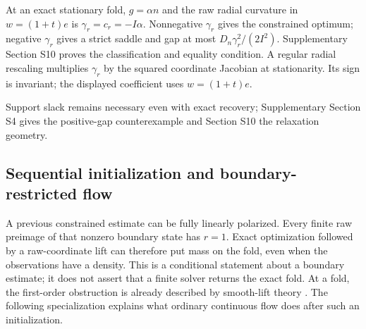 \documentclass[pdflatex,sn-mathphys-num]{sn-jnl}
\begin{document}
At an exact stationary fold, $g=\alpha n$ and the raw radial curvature in $w=(1+t)e$ is $\gamma_r=c_r=-I\alpha$. Nonnegative $\gamma_r$ gives the constrained optimum; negative $\gamma_r$ gives a strict saddle and gap at most $D_n\gamma_r^2/(2I^2)$. Supplementary Section S10 proves the classification and equality condition. A regular radial rescaling multiplies $\gamma_r$ by the squared coordinate Jacobian at stationarity. Its sign is invariant; the displayed coefficient uses $w=(1+t)e$.

Support slack remains necessary even with exact recovery; Supplementary Section S4 gives the positive-gap counterexample and Section S10 the relaxation geometry.





\subsection{Sequential initialization and boundary-restricted flow}
\label{sec:sequential}
A previous constrained estimate can be fully linearly polarized. Every finite raw preimage of that nonzero boundary state has $r=1$. Exact optimization followed by a raw-coordinate lift can therefore put mass on the fold, even when the observations have a density. This is a conditional statement about a boundary estimate; it does not assert that a finite solver returns the exact fold. At a fold, the first-order obstruction is already described by smooth-lift theory \cite[Thm.~2.4]{lifts}. The following specialization explains what ordinary continuous flow does after such an initialization.
\end{document}
